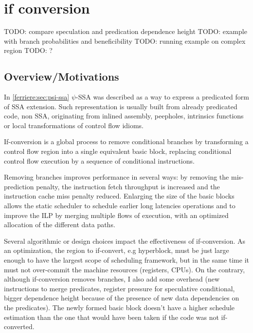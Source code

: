\chapter{if conversion }
\graphicspath{{img/}{if_conversion/img/}{part4/if_conversion/img/}}
	
\newcommand\cond{~?~}

TODO: compare speculation and predication dependence height
TODO: example with branch probabilities and beneficibility
TODO: running example on complex region
TODO: ?

\section{Overview/Motivations}

In \ref{ferriere:sec:psi-ssa} $\psi$-SSA was described as a way to express a predicated form of SSA extension. Such representation is usually built from already predicated code, non SSA, originating from inlined assembly, peepholes, intrinsics functions or local transformations of control flow idioms.

If-conversion is a global process to remove conditional branches by transforming a control flow region into a single equivalent basic block, replacing conditional control flow execution by a sequence of conditional instructions. 

Removing branches improves performance in several ways: by removing the mis-prediction penalty, the instruction fetch throughput is increased and the instruction cache miss penalty reduced. Enlarging the size of the basic blocks allows the static scheduler to schedule earlier long latencies operations and to improve the ILP by merging multiple flows of execution, with an optimized allocation of the different data paths. 

Several algorithmic or design choices impact the effectiveness of if-conversion. As an optimization, the region to if-convert, e.g hyperblock, must be just large enough to have the largest scope of scheduling framework, but in the same time it must not over-commit the machine resources (registers, CPUs). On the contrary, although if-conversion removes branches, I also add some overhead (new instructions to merge predicates, register pressure for speculative conditional, bigger dependence height because of the presence of new data dependencies on the predicates). The newly formed basic block doesn't have a higher schedule estimation than the one that would have been taken if the code was not if-converted.

